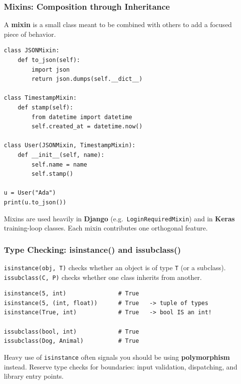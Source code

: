 \documentclass[aspectratio=169,10pt]{beamer}
\newcommand{\keyword}[1]{\textcolor{PrimaryBlue}{\textbf{#1}}}
\newcommand{\codeword}[1]{\texttt{#1}}
\newenvironment{bluebox}[1]{%
  \vspace{0.08cm}\begin{tcolorbox}[lecturebox,title={#1},fontupper=\small]%
}{\end{tcolorbox}\vspace{0.05cm}}
\begin{document}
\begin{frame}[fragile]
\frametitle{Mixins: Composition through Inheritance}
\small
A \keyword{mixin} is a small class meant to be combined with others to add a focused piece of behavior.

\vspace{0.1cm}
\begin{lstlisting}[style=pycode]
class JSONMixin:
    def to_json(self):
        import json
        return json.dumps(self.__dict__)

class TimestampMixin:
    def stamp(self):
        from datetime import datetime
        self.created_at = datetime.now()

class User(JSONMixin, TimestampMixin):
    def __init__(self, name):
        self.name = name
        self.stamp()

u = User("Ada")
print(u.to_json())
\end{lstlisting}

\begin{tcolorbox}[lecturebox,title=Where you have seen this]
Mixins are used heavily in \keyword{Django} (e.g.\ \codeword{LoginRequiredMixin}) and in \keyword{Keras} training-loop classes. Each mixin contributes one orthogonal feature.
\end{tcolorbox}
\end{frame}


\begin{frame}[fragile]
\frametitle{Type Checking: isinstance() and issubclass()}
\small
\codeword{isinstance(obj, T)} checks whether an object is of type \texttt{T} (or a subclass). \codeword{issubclass(C, P)} checks whether one class inherits from another.

\vspace{0.12cm}
\begin{lstlisting}[style=pycode]
isinstance(5, int)               # True
isinstance(5, (int, float))      # True   -> tuple of types
isinstance(True, int)            # True   -> bool IS an int!

issubclass(bool, int)            # True
issubclass(Dog, Animal)          # True
\end{lstlisting}

\begin{bluebox}{Use sparingly}
Heavy use of \codeword{isinstance} often signals you should be using \keyword{polymorphism} instead. Reserve type checks for boundaries: input validation, dispatching, and library entry points.
\end{bluebox}
\end{frame}
\end{document}
